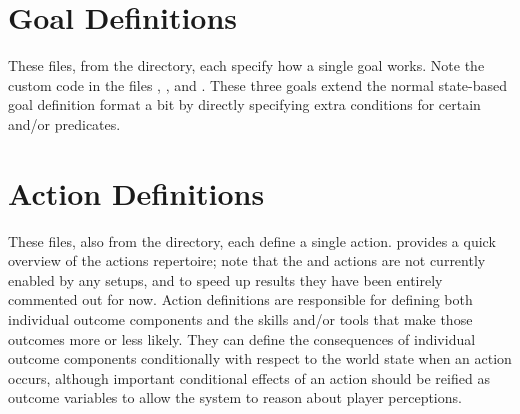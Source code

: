 \section{Goal Definitions}
\label{sec:src-goals}

These files, from the  directory, each specify how a single goal works.
%
Note the custom code in the files , , and .
%
These three goals extend the normal state-based goal definition format a bit by directly specifying extra conditions for certain  and/or  predicates.


\section{Action Definitions}
\label{sec:src-actions}

These files, also from the  directory, each define a single action.
%
 provides a quick overview of the actions repertoire; note that the   and  actions are not currently enabled by any setups, and to speed up results they have been entirely commented out for now.
%
Action definitions are responsible for defining both individual outcome components and the skills and/or tools that make those outcomes more or less likely.
%
They can define the consequences of individual outcome components conditionally with respect to the world state when an action occurs, although important conditional effects of an action should be reified as outcome variables to allow the system to reason about player perceptions.

